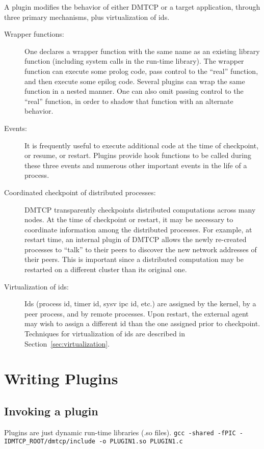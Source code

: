 \documentclass{article}
\begin{document}
A plugin modifies the behavior of either DMTCP or a target application,
through three primary mechanisms, plus virtualization of ids.
\begin{description}
\item[Wrapper functions:]  One declares a wrapper function with the same
	name as an existing library function (including system calls in
	the run-time library).  The wrapper function can execute some
	prolog code, pass control to the ``real'' function,
	and then execute some epilog code.  Several plugins can wrap
	the same function in a nested manner.  One can also omit
	passing control to the ``real'' function, in order to shadow
	that function with an alternate behavior.
\item[Events:]  It is frequently useful to execute additional code
	at the time of checkpoint, or resume, or restart.  Plugins
	provide hook functions	to be called during these three events
	and numerous other important events in the life of a process.
\item[Coordinated checkpoint of distributed processes:]  DMTCP transparently
	checkpoints distributed computations across many nodes.
	At the time of checkpoint or restart, it may be necessary to
	coordinate information among the distributed processes.  For example,
	at restart time, an internal plugin of DMTCP allows the newly
	re-created processes to ``talk'' to their peers to discover the
	new network addresses of their peers.  This is important since
	a distributed computation may be restarted on a different cluster
	than its original one.
\item[Virtualization of ids:]  Ids (process id, timer id, sysv ipc id, etc.)
	are assigned by the kernel, by a peer process, and by remote processes.
	Upon restart, the external agent may wish to assign a different
	id than the one assigned prior to checkpoint.  Techniques for
	virtualization of ids are described in
        Section~\ref{sec:virtualization}.
\end{description}

\section{Writing Plugins}

\subsection{Invoking a plugin}

Plugins are just dynamic run-time libraries (.so files).
\hfill\break
\medskip\noindent
  \hspace{0.3truein} {\tt gcc -shared -fPIC -IDMTCP\_ROOT/dmtcp/include
                         -o PLUGIN1.so PLUGIN1.c}
\medskip
\end{document}
